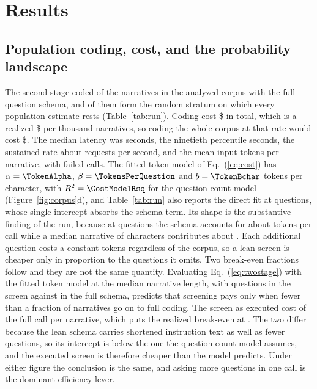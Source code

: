 \section{Results}
\label{sec:results}

\subsection{Population coding, cost, and the probability landscape}
\label{sec:res-population}

The second stage coded \NstageTwo{} of the \Ncorpus{} narratives in the analyzed corpus with
the full \NQuestions{}-question schema, and \NstageTwoRandom{} of them form the random
stratum on which every population estimate rests (Table~\ref{tab:run}). Coding cost
\$\StageTwoCost{} in total, which is a realized \$\CostPerThousand{} per thousand narratives,
so coding the whole corpus at that rate would cost \$\CostWholeCorpus{}. The median latency
was \MedianLatency{} seconds, the ninetieth percentile \StageTwoPNinetyLatency{} seconds, the
sustained rate about \StageTwoReqPerS{} requests per second, and the mean input
\MeanTokens{} tokens per narrative, with \StageTwoErrors{} failed calls. The fitted token
model of Eq.~(\ref{eq:cost}) has $\alpha = \TokenAlpha$, $\beta = \TokensPerQuestion$ and
$b = \TokenBchar$ tokens per character, with $R^2 = \CostModelRsq$ for the question-count model (Figure~\ref{fig:corpus}d), and Table~\ref{tab:run} also reports the direct fit at \NQuestions{} questions, whose single intercept absorbs the schema term. Its shape is the substantive finding of the run, because at
\NQuestions{} questions the schema accounts for about \SchemaTokens{} tokens per call while
a median narrative of \MedianChars{} characters contributes about \NarrativeTokens{}. Each
additional question costs a constant \TokensPerQuestion{} tokens regardless of the corpus,
so a lean screen is cheaper only in proportion to the questions it omits. Two break-even
fractions follow and they are not the same quantity. Evaluating Eq.~(\ref{eq:twostage}) with
the fitted token model at the median narrative length, with \SchemaQScreen{} questions in the
screen against \SchemaQFull{} in the full schema, predicts that screening pays only when fewer
than a fraction \BreakEvenModel{} of narratives go on to full coding. The screen as executed
cost \ScreenCostShare{} of the full call per narrative, which puts the realized break-even at
\BreakEvenFraction{}. The two differ because the lean schema carries shortened instruction
text as well as fewer questions, so its intercept is below the one the question-count model
assumes, and the executed screen is therefore cheaper than the model predicts. Under either
figure the conclusion is the same, and asking more questions in one call is the dominant
efficiency lever.

